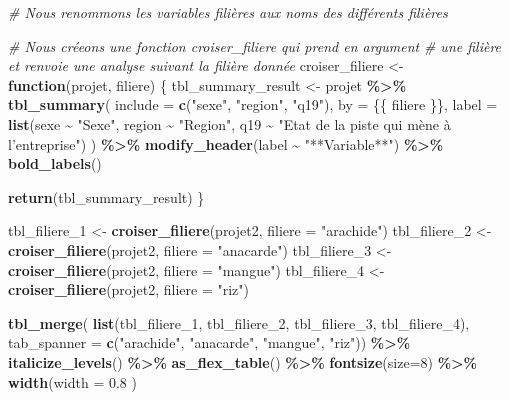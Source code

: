 \documentclass[
]{article}
\newenvironment{Shaded}{\begin{snugshade}}{\end{snugshade}}
\newcommand{\AttributeTok}[1]{\textcolor[rgb]{0.13,0.29,0.53}{#1}}
\newcommand{\CommentTok}[1]{\textcolor[rgb]{0.56,0.35,0.01}{\textit{#1}}}
\newcommand{\ControlFlowTok}[1]{\textcolor[rgb]{0.13,0.29,0.53}{\textbf{#1}}}
\newcommand{\DecValTok}[1]{\textcolor[rgb]{0.00,0.00,0.81}{#1}}
\newcommand{\FloatTok}[1]{\textcolor[rgb]{0.00,0.00,0.81}{#1}}
\newcommand{\FunctionTok}[1]{\textcolor[rgb]{0.13,0.29,0.53}{\textbf{#1}}}
\newcommand{\NormalTok}[1]{#1}
\newcommand{\OtherTok}[1]{\textcolor[rgb]{0.56,0.35,0.01}{#1}}
\newcommand{\SpecialCharTok}[1]{\textcolor[rgb]{0.81,0.36,0.00}{\textbf{#1}}}
\newcommand{\StringTok}[1]{\textcolor[rgb]{0.31,0.60,0.02}{#1}}
\begin{document}
\begin{Shaded}
\begin{Highlighting}[]
\CommentTok{\# Nous renommons les variables filières aux noms des différents filières}

\CommentTok{\# Nous créeons une fonction croiser\_filiere qui prend en argument}
\CommentTok{\# une filière et renvoie une analyse suivant la filière donnée}
\NormalTok{croiser\_filiere }\OtherTok{\textless{}{-}} \ControlFlowTok{function}\NormalTok{(projet, filiere) \{}
\NormalTok{  tbl\_summary\_result }\OtherTok{\textless{}{-}}\NormalTok{ projet }\SpecialCharTok{\%\textgreater{}\%}
    \FunctionTok{tbl\_summary}\NormalTok{(}
      \AttributeTok{include =} \FunctionTok{c}\NormalTok{(}\StringTok{"sexe"}\NormalTok{, }\StringTok{"region"}\NormalTok{, }\StringTok{"q19"}\NormalTok{),}
      \AttributeTok{by =}\NormalTok{ \{\{ filiere \}\},}
      \AttributeTok{label =} \FunctionTok{list}\NormalTok{(sexe }\SpecialCharTok{\textasciitilde{}} \StringTok{"Sexe"}\NormalTok{,}
\NormalTok{                   region }\SpecialCharTok{\textasciitilde{}} \StringTok{"Region"}\NormalTok{,}
\NormalTok{                   q19 }\SpecialCharTok{\textasciitilde{}} \StringTok{"Etat de la piste qui mène à l’entreprise"}\NormalTok{)}
\NormalTok{    ) }\SpecialCharTok{\%\textgreater{}\%}
    \FunctionTok{modify\_header}\NormalTok{(label }\SpecialCharTok{\textasciitilde{}} \StringTok{"**Variable**"}\NormalTok{) }\SpecialCharTok{\%\textgreater{}\%}
    \FunctionTok{bold\_labels}\NormalTok{()}
  
  \FunctionTok{return}\NormalTok{(tbl\_summary\_result)}
\NormalTok{\}}

\NormalTok{tbl\_filiere\_1 }\OtherTok{\textless{}{-}} \FunctionTok{croiser\_filiere}\NormalTok{(projet2, }\AttributeTok{filiere =} \StringTok{"arachide"}\NormalTok{)}
\NormalTok{tbl\_filiere\_2 }\OtherTok{\textless{}{-}} \FunctionTok{croiser\_filiere}\NormalTok{(projet2, }\AttributeTok{filiere =} \StringTok{"anacarde"}\NormalTok{)}
\NormalTok{tbl\_filiere\_3 }\OtherTok{\textless{}{-}} \FunctionTok{croiser\_filiere}\NormalTok{(projet2, }\AttributeTok{filiere =} \StringTok{"mangue"}\NormalTok{)}
\NormalTok{tbl\_filiere\_4 }\OtherTok{\textless{}{-}} \FunctionTok{croiser\_filiere}\NormalTok{(projet2, }\AttributeTok{filiere =} \StringTok{"riz"}\NormalTok{)}

\FunctionTok{tbl\_merge}\NormalTok{(}
  \FunctionTok{list}\NormalTok{(tbl\_filiere\_1, tbl\_filiere\_2, tbl\_filiere\_3, tbl\_filiere\_4),}
  \AttributeTok{tab\_spanner =} \FunctionTok{c}\NormalTok{(}\StringTok{"arachide"}\NormalTok{, }\StringTok{"anacarde"}\NormalTok{, }\StringTok{"mangue"}\NormalTok{, }\StringTok{"riz"}\NormalTok{)) }\SpecialCharTok{\%\textgreater{}\%}
  \FunctionTok{italicize\_levels}\NormalTok{() }\SpecialCharTok{\%\textgreater{}\%}
  \FunctionTok{as\_flex\_table}\NormalTok{() }\SpecialCharTok{\%\textgreater{}\%}
  \FunctionTok{fontsize}\NormalTok{(}\AttributeTok{size=}\DecValTok{8}\NormalTok{) }\SpecialCharTok{\%\textgreater{}\%}
  \FunctionTok{width}\NormalTok{(}\AttributeTok{width =} \FloatTok{0.8}\NormalTok{ )}
\end{Highlighting}
\end{Shaded}
\end{document}
